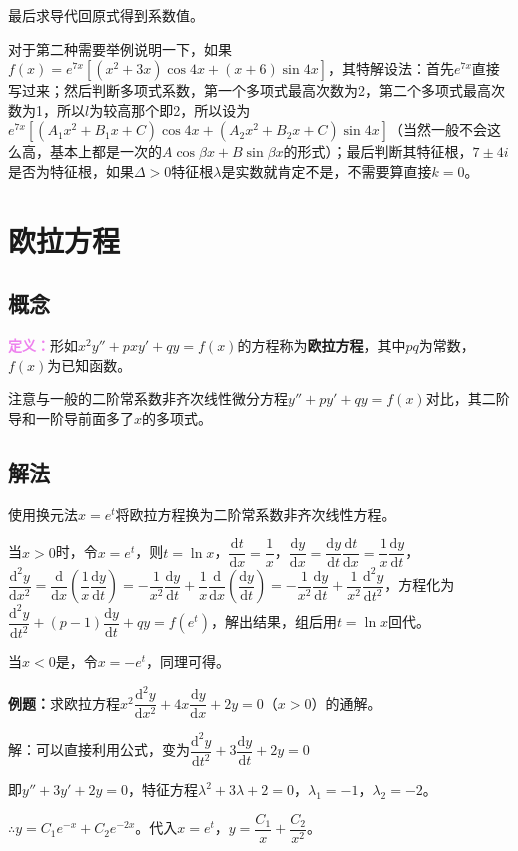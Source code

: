 \documentclass[UTF8, 12pt]{ctexart}
\begin{document}
        最后求导代回原式得到系数值。

        对于第二种需要举例说明一下，如果$f(x)=e^{7x}[(x^2+3x)\cos4x+(x+6)\sin4x]$，其特解设法：首先$e^{7x}$直接写过来；然后判断多项式系数，第一个多项式最高次数为2，第二个多项式最高次数为1，所以$l$为较高那个即2，所以设为$e^{7x}[(A_1x^2+B_1x+C)\cos4x+(A_2x^2+B_2x+C)\sin4x]$（当然一般不会这么高，基本上都是一次的$A\cos\beta x+B\sin\beta x$的形式）；最后判断其特征根，$7\pm4i$是否为特征根，如果$\Delta>0$特征根$\lambda$是实数就肯定不是，不需要算直接$k=0$。

        \section{欧拉方程}

        \subsection{概念}

        \textcolor{violet}{\textbf{定义：}}形如$x^2y''+pxy'+qy=f(x)$的方程称为\textbf{欧拉方程}，其中$pq$为常数，$f(x)$为已知函数。

        注意与一般的二阶常系数非齐次线性微分方程$y''+py'+qy=f(x)$对比，其二阶导和一阶导前面多了$x$的多项式。


        \subsection{解法}

        使用换元法$x=e^t$将欧拉方程换为二阶常系数非齐次线性方程。

        当$x>0$时，令$x=e^t$，则$t=\ln x$，$\dfrac{\textrm{d}t}{\textrm{d}x}=\dfrac{1}{x}$，$\dfrac{\textrm{d}y}{\textrm{d}x}=\dfrac{\textrm{d}y}{\textrm{d}t}\dfrac{\textrm{d}t}{\textrm{d}x}=\dfrac{1}{x}\dfrac{\textrm{d}y}{\textrm{d}t}$，$\dfrac{\textrm{d}^2y}{\textrm{d}x^2}=\dfrac{\textrm{d}}{\textrm{d}x}\left(\dfrac{1}{x}\dfrac{\textrm{d}y}{\textrm{d}t}\right)=-\dfrac{1}{x^2}\dfrac{\textrm{d}y}{\textrm{d}t}+\dfrac{1}{x}\dfrac{\textrm{d}}{\textrm{d}x}\left(\dfrac{\textrm{d}y}{\textrm{d}t}\right)=-\dfrac{1}{x^2}\dfrac{\textrm{d}y}{\textrm{d}t}+\dfrac{1}{x^2}\dfrac{\textrm{d}^2y}{\textrm{d}t^2}$，方程化为$\dfrac{\textrm{d}^2y}{\textrm{d}t^2}+(p-1)\dfrac{\textrm{d}y}{\textrm{d}t}+qy=f(e^t)$，解出结果，组后用$t=\ln x$回代。

        当$x<0$是，令$x=-e^t$，同理可得。

        \textbf{例题：}求欧拉方程$x^2\dfrac{\textrm{d}^2y}{\textrm{d}x^2}+4x\dfrac{\textrm{d}y}{\textrm{d}x}+2y=0$（$x>0$）的通解。

        解：可以直接利用公式，变为$\dfrac{\textrm{d}^2y}{\textrm{d}t^2}+3\dfrac{\textrm{d}y}{\textrm{d}t}+2y=0$

        即$y''+3y'+2y=0$，特征方程$\lambda^2+3\lambda+2=0$，$\lambda_1=-1$，$\lambda_2=-2$。

        $\therefore y=C_1e^{-x}+C_2e^{-2x}$。代入$x=e^t$，$y=\dfrac{C_1}{x}+\dfrac{C_2}{x^2}$。
\end{document}
